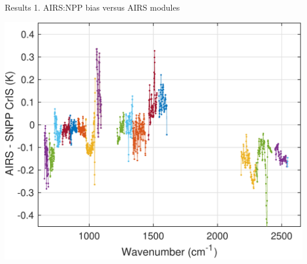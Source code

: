 \documentclass[10pt,t]{beamer}
\begin{document}




\begin{frame}{Results 1. AIRS:NPP bias versus AIRS modules}

\vspace{-0.1in}
  \begin{center}
    \includegraphics[width=0.7\linewidth]{./Strow/airs_minus_cris_airs_array_colors.pdf}
\end{center}
  \end{frame}
\end{document}
